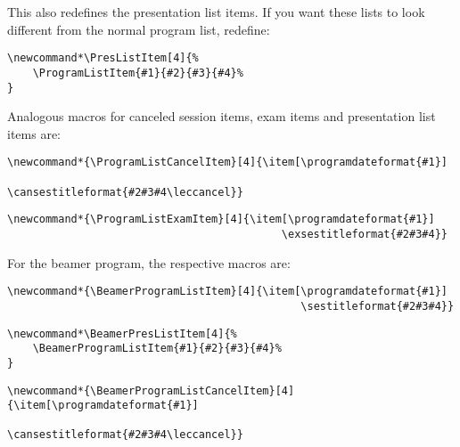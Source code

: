 \documentclass[english]{article}
\begin{document}
%
This also redefines the presentation list items. 
If you want these lists to look different from the normal program list, redefine:
\begin{lstlisting}[language={[LaTeX]TeX},basicstyle={\small\ttfamily},
frame=single,moretexcs={[2]{PresListItem,ProgramListItem}}]
\newcommand*\PresListItem[4]{%
    \ProgramListItem{#1}{#2}{#3}{#4}%
}
\end{lstlisting}
%
Analogous macros for canceled session items, exam items and presentation list items are:
\begin{lstlisting}[language={[LaTeX]TeX},basicstyle={\small\ttfamily},
frame=single,moretexcs={[3]{ProgramListCancelItem,programdateformat,cansestitleformat}}]
\newcommand*{\ProgramListCancelItem}[4]{\item[\programdateformat{#1}]
                                             \cansestitleformat{#2#3#4\leccancel}}
\end{lstlisting}
\begin{lstlisting}[language={[LaTeX]TeX},basicstyle={\small\ttfamily},
frame=single,moretexcs={[3]{ProgramListExamItem,programdateformat,exsestitleformat}}]
\newcommand*{\ProgramListExamItem}[4]{\item[\programdateformat{#1}]
                                           \exsestitleformat{#2#3#4}}
\end{lstlisting}
%
For the beamer program, the respective macros are:
\begin{lstlisting}[language={[LaTeX]TeX},basicstyle={\small\ttfamily},
frame=single,moretexcs={[3]{BeamerProgramListItem,programdateformat,sestitleformat}}]
\newcommand*{\BeamerProgramListItem}[4]{\item[\programdateformat{#1}]
                                              \sestitleformat{#2#3#4}}
\end{lstlisting}
\begin{lstlisting}[language={[LaTeX]TeX},basicstyle={\small\ttfamily},
frame=single,moretexcs={[2]{BeamerPresListItem,BeamerProgramListItem}}]
\newcommand*\BeamerPresListItem[4]{%
    \BeamerProgramListItem{#1}{#2}{#3}{#4}%
}
\end{lstlisting}
\begin{lstlisting}[language={[LaTeX]TeX},basicstyle={\small\ttfamily},
frame=single,moretexcs={[3]{BeamerProgramListCancelItem,programdateformat,cansestitleformat}}]
\newcommand*{\BeamerProgramListCancelItem}[4]{\item[\programdateformat{#1}]
                                              \cansestitleformat{#2#3#4\leccancel}}
\end{lstlisting}
\end{document}
